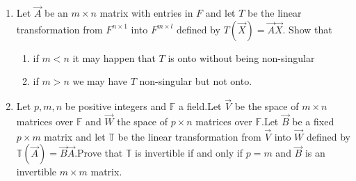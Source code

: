 \begin{enumerate}[label=\thesubsection.\arabic*.,ref=\thesubsection.\theenumi]
%
\item Let $\vec{A}$ be an $m \times n$ matrix with entries in $F$ and let $T$ be the linear transformation from $F^{n \times1 }$ into $F^{m \times l}$ defined by $T(\vec{X}) = \vec{A}\vec{X}$. Show that 
\begin{enumerate}
\item
if $m < n$ it may happen that $T$ is onto without being non-singular
\item
if $m>n$ we may have $T$ non-singular but not onto.
\\
\end{enumerate}
%
\solution

%
\item Let $p,m,n$ be positive integers and $\mathbb{F}$ a field.Let $\vec{V}$ be the space of $m \times n$ matrices over $\mathbb{F}$ and $\vec{W}$ the space of $p \times n$ matrices over $\mathbb{F}$.Let $\vec{B}$ be a fixed $p \times m$ matrix and let $\mathbb{T}$ be the linear transformation from $\vec{V}$ into $\vec{W}$ defined by $\mathbb{T}(\vec{A})=\vec{B}\vec{A}$.Prove that $\mathbb{T}$ is invertible if and only if $p=m$ and $\vec{B}$ is an invertible $m \times m$ matrix. 
%
\solution


\end{enumerate}
